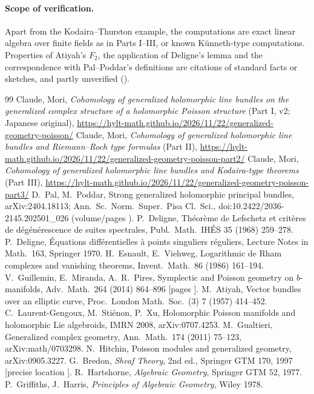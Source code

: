 \paragraph{Scope of verification.}Apart from the Kodaira--Thurston example, the computations are exact linear algebra over finite fields as in Parts I--III, or known Künneth-type computations. Properties of Atiyah's $F_2$, the application of Deligne's lemma and the correspondence with Pal--Poddar's definitions are citations of standard facts or sketches, and partly unverified (\tQ).

\begin{thebibliography}{99}\small
{} Claude, Mori, \emph{Cohomology of generalized holomorphic line bundles on the generalized complex structure of a holomorphic Poisson structure} (Part I, v2; Japanese original), \url{https://hylt-math.github.io/2026/11/22/generalized-geometry-poisson/}
 Claude, Mori, \emph{Cohomology of generalized holomorphic line bundles and Riemann--Roch type formulas} (Part II), \url{https://hylt-math.github.io/2026/11/22/generalized-geometry-poisson-part2/}
 Claude, Mori, \emph{Cohomology of generalized holomorphic line bundles and Kodaira-type theorems} (Part III), \url{https://hylt-math.github.io/2026/11/22/generalized-geometry-poisson-part3/}
 D.\ Pal, M.\ Poddar, Strong generalized holomorphic principal bundles, arXiv:2404.18113; Ann.\ Sc.\ Norm.\ Super.\ Pisa Cl.\ Sci., doi:10.2422/2036-2145.202501\_026 (volume/pages \tQ).
 P.\ Deligne, Th\'eor\`eme de Lefschetz et crit\`eres de d\'eg\'en\'erescence de suites spectrales, Publ.\ Math.\ IH\'ES 35 (1968) 259--278.
 P.\ Deligne, \'Equations diff\'erentielles \`a points singuliers r\'eguliers, Lecture Notes in Math.\ 163, Springer 1970.
 H.\ Esnault, E.\ Viehweg, Logarithmic de Rham complexes and vanishing theorems, Invent.\ Math.\ 86 (1986) 161--194.
 V.\ Guillemin, E.\ Miranda, A.\ R.\ Pires, Symplectic and Poisson geometry on $b$-manifolds, Adv.\ Math.\ 264 (2014) 864--896 [pages \tQ].
 M.\ Atiyah, Vector bundles over an elliptic curve, Proc.\ London Math.\ Soc.\ (3) 7 (1957) 414--452.
 C.\ Laurent-Gengoux, M.\ Sti\'enon, P.\ Xu, Holomorphic Poisson manifolds and holomorphic Lie algebroids, IMRN 2008, arXiv:0707.4253.
 M.\ Gualtieri, Generalized complex geometry, Ann.\ Math.\ 174 (2011) 75--123, arXiv:math/0703298.
 N.\ Hitchin, Poisson modules and generalized geometry, arXiv:0905.3227.
 G.\ Bredon, \emph{Sheaf Theory}, 2nd ed., Springer GTM 170, 1997 [precise location \tQ].
 R.\ Hartshorne, \emph{Algebraic Geometry}, Springer GTM 52, 1977.
 P.\ Griffiths, J.\ Harris, \emph{Principles of Algebraic Geometry}, Wiley 1978.
\end{thebibliography}
